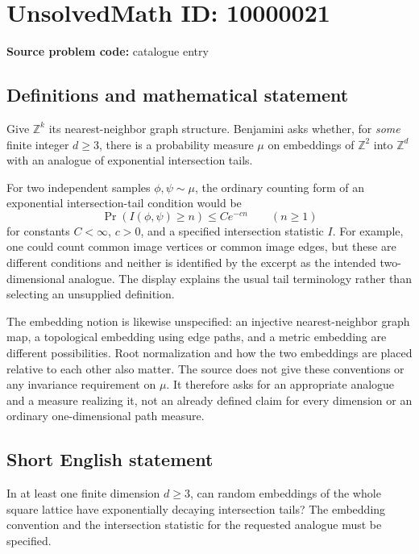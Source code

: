 \documentclass[11pt]{article}
\newcommand{\Z}{\mathbb{Z}}
\begin{document}
\section*{UnsolvedMath ID: 10000021}
\textbf{Source problem code:} catalogue entry
\subsection{Definitions and mathematical statement}
Give \(\Z^k\) its nearest-neighbor graph structure. Benjamini asks whether, for \emph{some} finite integer \(d\geq3\), there is a probability measure \(\mu\) on embeddings of \(\Z^2\) into \(\Z^d\) with an analogue of exponential intersection tails.

For two independent samples \(\phi,\psi\sim\mu\), the ordinary counting form of an exponential intersection-tail condition would be
\[
 \Pr(I(\phi,\psi)\geq n)\leq C e^{-cn}\qquad(n\geq1)
\]
for constants \(C<\infty\), \(c>0\), and a specified intersection statistic \(I\). For example, one could count common image vertices or common image edges, but these are different conditions and neither is identified by the excerpt as the intended two-dimensional analogue. The display explains the usual tail terminology rather than selecting an unsupplied definition.

The embedding notion is likewise unspecified: an injective nearest-neighbor graph map, a topological embedding using edge paths, and a metric embedding are different possibilities. Root normalization and how the two embeddings are placed relative to each other also matter. The source does not give these conventions or any invariance requirement on \(\mu\). It therefore asks for an appropriate analogue and a measure realizing it, not an already defined claim for every dimension or an ordinary one-dimensional path measure.
\subsection{Short English statement}
In at least one finite dimension \(d\geq3\), can random embeddings of the whole square lattice have exponentially decaying intersection tails? The embedding convention and the intersection statistic for the requested analogue must be specified.
\end{document}
